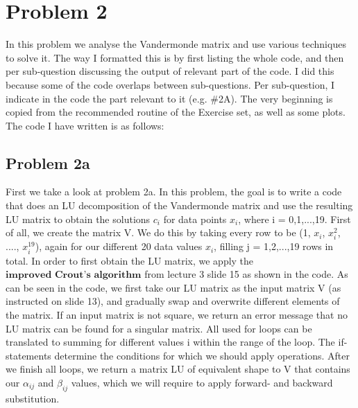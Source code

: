 \section{Problem 2}

In this problem we analyse the Vandermonde matrix and use various techniques to solve it. The way I formatted this is by first listing the whole code, and then per sub-question discussing the output of relevant part of the code. I did this because some of the code overlaps between sub-questions. Per sub-question, I indicate in the code the part relevant to it (e.g. \#2A). The very beginning is copied from the recommended routine of the Exercise set, as well as some plots. The code I have written is as follows: 



\subsection{Problem 2a}

First we take a look at problem 2a. In this problem, the goal is to write a code that does an LU decomposition of the Vandermonde matrix and use the resulting LU matrix to obtain the solutions $c_i$ for data points $x_i$, where i = 0,1,...,19. First of all, we create the matrix V. We do this by taking every row to be (1, $x_i$, $x_{i}^2$, ...., $x_{i}^{19}$), again for our different 20 data values $x_i$, filling j = 1,2,...,19 rows in total. In order to first obtain the LU matrix, we apply the $\textbf{improved Crout's algorithm}$ from lecture 3 slide 15 as shown in the code. As can be seen in the code, we first take our LU matrix as the input matrix V (as instructed on slide 13), and gradually swap and overwrite different elements of the matrix. If an input matrix is not square, we return an error message that no LU matrix can be found for a singular matrix. All used for loops can be translated to summing for different values i within the range of the loop. The if-statements determine the conditions for which we should apply operations. After we finish all loops, we return a matrix LU of equivalent shape to V that contains our $\alpha_{ij}$ and $\beta_{ij}$ values, which we will require to apply forward- and backward substitution.\\

